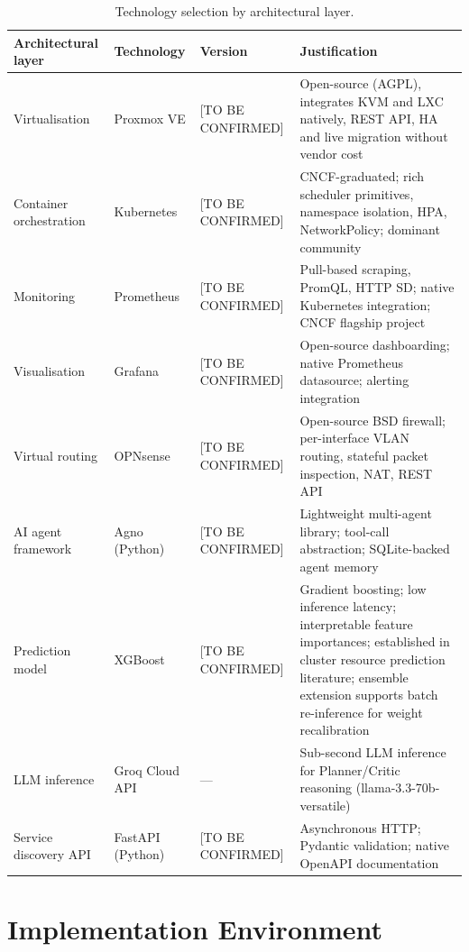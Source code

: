 \documentclass[12pt,a4paper]{report}
\begin{document}
\begin{table}[htbp]
\centering
\caption{Technology selection by architectural layer.}
\label{tab:tech_selection}
\begin{tabular}{L{3cm} L{2.8cm} C{1.8cm} L{5.5cm}}
\toprule
\textbf{Architectural layer} & \textbf{Technology} & \textbf{Version} & \textbf{Justification} \\
\midrule
Virtualisation         & Proxmox VE     & [TO BE CONFIRMED] & Open-source (AGPL), integrates KVM and LXC natively, REST API, HA and live migration without vendor cost \\
Container orchestration & Kubernetes    & [TO BE CONFIRMED] & CNCF-graduated; rich scheduler primitives, namespace isolation, HPA, NetworkPolicy; dominant community \\
Monitoring             & Prometheus     & [TO BE CONFIRMED] & Pull-based scraping, PromQL, HTTP SD; native Kubernetes integration; \textsc{CNCF} flagship project \\
Visualisation          & Grafana        & [TO BE CONFIRMED] & Open-source dashboarding; native Prometheus datasource; alerting integration \\
Virtual routing        & OPNsense       & [TO BE CONFIRMED] & Open-source BSD firewall; per-interface VLAN routing, stateful packet inspection, NAT, REST API \\
AI agent framework     & Agno (Python)  & [TO BE CONFIRMED] & Lightweight multi-agent library; tool-call abstraction; SQLite-backed agent memory \\
Prediction model       & XGBoost        & [TO BE CONFIRMED] & Gradient boosting; low inference latency; interpretable feature importances; established in cluster resource prediction literature; ensemble extension supports batch re-inference for weight recalibration \\
LLM inference          & Groq Cloud API & ---               & Sub-second LLM inference for Planner/Critic reasoning (llama-3.3-70b-versatile) \\
Service discovery API  & FastAPI (Python) & [TO BE CONFIRMED] & Asynchronous HTTP; Pydantic validation; native OpenAPI documentation \\
\bottomrule
\end{tabular}
\end{table}

\section{Implementation Environment}
\end{document}
